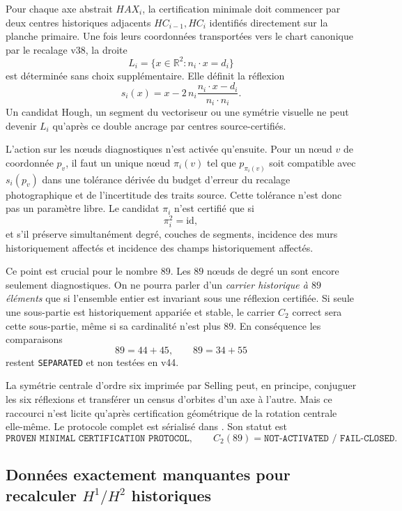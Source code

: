 \documentclass[11pt,a4paper]{article}
\newcommand{\certSeparated}{\texttt{SEPARATED}}
\begin{document}
Pour chaque axe abstrait $HAX_i$, la certification minimale doit commencer par deux centres historiques adjacents $HC_{i-1},HC_i$ identifiés directement sur la planche primaire. Une fois leurs coordonnées transportées vers le chart canonique par le recalage v38, la droite
\[
 L_i=\{x\in\mathbb R^2:n_i\!\cdot x=d_i\}
\]
est déterminée sans choix supplémentaire. Elle définit la réflexion
\begin{equation}\label{eq:v44-reflection}
 s_i(x)=x-2\,n_i\frac{n_i\cdot x-d_i}{n_i\cdot n_i}.
\end{equation}
Un candidat Hough, un segment du vectoriseur ou une symétrie visuelle ne peut devenir $L_i$ qu'après ce double ancrage par centres source-certifiés.

L'action sur les nœuds diagnostiques n'est activée qu'ensuite. Pour un nœud $v$ de coordonnée $p_v$, il faut un unique nœud $\pi_i(v)$ tel que $p_{\pi_i(v)}$ soit compatible avec $s_i(p_v)$ dans une tolérance dérivée du budget d'erreur du recalage photographique et de l'incertitude des traits source. Cette tolérance n'est donc pas un paramètre libre. Le candidat $\pi_i$ n'est certifié que si
\[
 \pi_i^2=\mathrm{id},
\]
et s'il préserve simultanément degré, couches de segments, incidence des murs historiquement affectés et incidence des champs historiquement affectés.

Ce point est crucial pour le nombre $89$. Les $89$ nœuds de degré un sont encore seulement diagnostiques. On ne pourra parler d'un \emph{carrier historique à $89$ éléments} que si l'ensemble entier est invariant sous une réflexion certifiée. Si seule une sous-partie est historiquement appariée et stable, le carrier $C_2$ correct sera cette sous-partie, même si sa cardinalité n'est plus $89$. En conséquence les comparaisons
\[
 89=44+45,
 \qquad
 89=34+55
\]
restent \certSeparated{} et non testées en v44.

La symétrie centrale d'ordre six imprimée par Selling peut, en principe, conjuguer les six réflexions et transférer un census d'orbites d'un axe à l'autre. Mais ce raccourci n'est licite qu'après certification géométrique de la rotation centrale elle-même. Le protocole complet est sérialisé dans . Son statut est
\[
 \boxed{\texttt{PROVEN MINIMAL CERTIFICATION PROTOCOL},\qquad
 C_2(89)=\texttt{NOT-ACTIVATED / FAIL-CLOSED}.}
\]

\subsection{Données exactement manquantes pour recalculer $H^1/H^2$ historiques}
\end{document}
